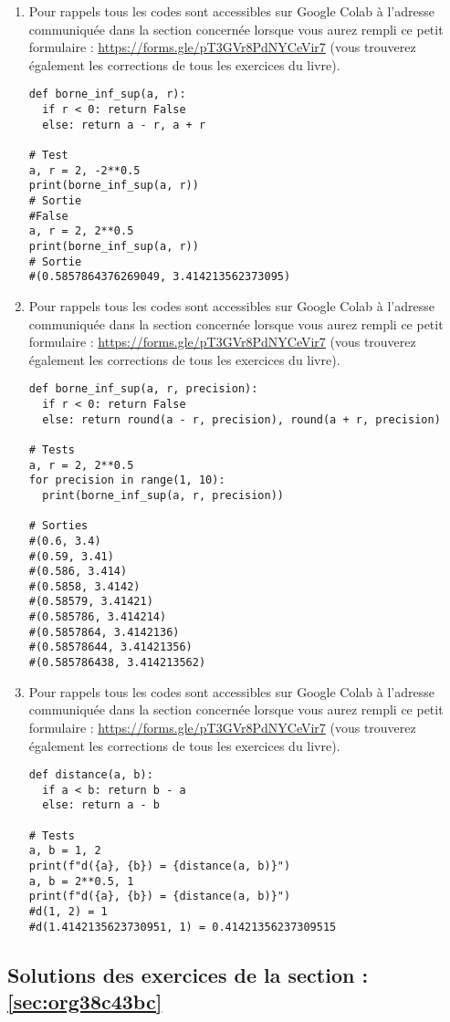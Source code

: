 \documentclass[a4paper, 11pt, twoside]{article}
\begin{document}
\begin{enumerate}
\item Pour rappels tous les codes sont accessibles sur Google Colab à
l'adresse communiquée dans la section concernée lorsque vous
aurez rempli ce petit formulaire :
\url{https://forms.gle/pT3GVr8PdNYCeVir7} (vous trouverez également
les corrections de tous les exercices du livre).
\begin{verbatim}
def borne_inf_sup(a, r):
  if r < 0: return False
  else: return a - r, a + r

# Test
a, r = 2, -2**0.5
print(borne_inf_sup(a, r))
# Sortie
#False
a, r = 2, 2**0.5
print(borne_inf_sup(a, r))
# Sortie
#(0.5857864376269049, 3.414213562373095)
\end{verbatim}
\item Pour rappels tous les codes sont accessibles sur Google Colab à
l'adresse communiquée dans la section concernée lorsque vous
aurez rempli ce petit formulaire :
\url{https://forms.gle/pT3GVr8PdNYCeVir7} (vous trouverez également
les corrections de tous les exercices du livre).
\begin{verbatim}
def borne_inf_sup(a, r, precision):
  if r < 0: return False
  else: return round(a - r, precision), round(a + r, precision)

# Tests
a, r = 2, 2**0.5
for precision in range(1, 10):
  print(borne_inf_sup(a, r, precision))

# Sorties
#(0.6, 3.4)
#(0.59, 3.41)
#(0.586, 3.414)
#(0.5858, 3.4142)
#(0.58579, 3.41421)
#(0.585786, 3.414214)
#(0.5857864, 3.4142136)
#(0.58578644, 3.41421356)
#(0.585786438, 3.414213562)
\end{verbatim}
\item Pour rappels tous les codes sont accessibles sur Google Colab à
l'adresse communiquée dans la section concernée lorsque vous
aurez rempli ce petit formulaire :
\url{https://forms.gle/pT3GVr8PdNYCeVir7} (vous trouverez également
les corrections de tous les exercices du livre).
\begin{verbatim}
def distance(a, b):
  if a < b: return b - a
  else: return a - b

# Tests
a, b = 1, 2
print(f"d({a}, {b}) = {distance(a, b)}")
a, b = 2**0.5, 1
print(f"d({a}, {b}) = {distance(a, b)}")
#d(1, 2) = 1
#d(1.4142135623730951, 1) = 0.41421356237309515
\end{verbatim}
\end{enumerate}
\stopcontents[level-2]

\subsection{Solutions des exercices de la section : \ref{sec:org38c43bc}}
\label{sec:org361b96b}
\end{document}
